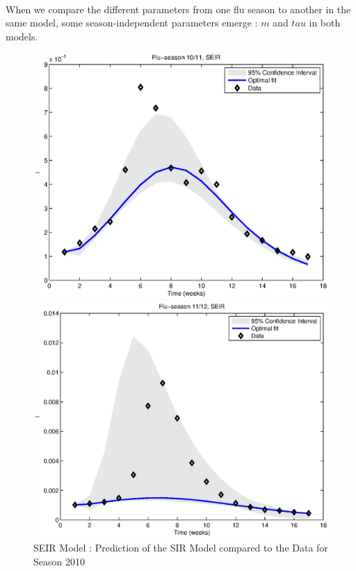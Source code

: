 \documentclass[11pt, a4paper]{article}
\begin{document}
\paragraph{}
When we compare the different parameters from one flu season to another in the same model, some season-independent parameters emerge :  $m$ and $tau$ in both models.

\begin{figure}[h]
\FloatBarrier
\centering
    \includegraphics[height = 0.25\textheight]{figures/SEIR_prediction_season1.eps}
    \caption{SEIR Model : Prediction of the SIR Model compared to the Data for Season 2010}
    \label{fig:seir_pred1}
    \includegraphics[height = 0.25\textheight]{figures/SEIR_prediction_season2.eps}

\end{figure}
\end{document}
